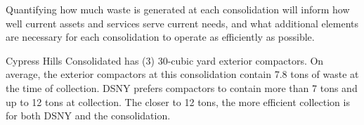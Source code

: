 
    Quantifying how much waste is generated at each consolidation will inform how well current assets and services serve current needs, and what additional elements are necessary for each consolidation to operate as efficiently as possible.
    
    Cypress Hills Consolidated has (3) 30-cubic yard exterior compactors. On average, the exterior compactors at this consolidation contain 7.8 tons of waste at the time of collection. DSNY prefers compactors to contain more than 7 tons and up to 12 tons at collection. The closer to 12 tons, the more efficient collection is for both DSNY and the consolidation.